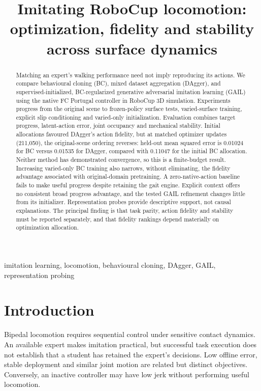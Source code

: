\documentclass[conference]{IEEEtran}
\title{Imitating RoboCup locomotion: optimization, fidelity and stability across surface dynamics}
\author{\IEEEauthorblockN{Author name to be supplied}
\IEEEauthorblockA{Department and institution to be supplied\\
City, Country\\
Email or ORCID to be supplied}}
\begin{document}
\maketitle


\begin{abstract}

Matching an expert's walking performance need not imply reproducing its actions. We compare behavioural cloning (BC), mixed dataset aggregation (DAgger), and supervised-initialized, BC-regularized generative adversarial imitation learning (GAIL) using the native FC Portugal controller in RoboCup 3D simulation. Experiments progress from the original scene to frozen-policy surface tests, varied-surface training, explicit slip conditioning and varied-only initialization. Evaluation combines target progress, latent-action error, joint occupancy and mechanical stability. Initial allocations favoured DAgger's action fidelity, but at matched optimizer updates (211,050), the original-scene ordering reverses: held-out mean squared error is 0.01024 for BC versus 0.01535 for DAgger, compared with 0.11047 for the initial BC allocation. Neither method has demonstrated convergence, so this is a finite-budget result. Increasing varied-only BC training also narrows, without eliminating, the fidelity advantage associated with original-domain pretraining. A zero-native-action baseline fails to make useful progress despite retaining the gait engine. Explicit context offers no consistent broad progress advantage, and the tested GAIL refinement changes little from its initializer. Representation probes provide descriptive support, not causal explanations. The principal finding is that task parity, action fidelity and stability must be reported separately, and that fidelity rankings depend materially on optimization allocation.

\end{abstract}
\begin{IEEEkeywords}
imitation learning, locomotion, behavioural cloning, DAgger, GAIL, representation probing
\end{IEEEkeywords}

\section{Introduction}

Bipedal locomotion requires sequential control under sensitive contact dynamics. An available expert makes imitation practical, but successful task execution does not establish that a student has retained the expert's decisions. Low offline error, stable deployment and similar joint motion are related but distinct objectives. Conversely, an inactive controller may have low jerk without performing useful locomotion.
\end{document}
